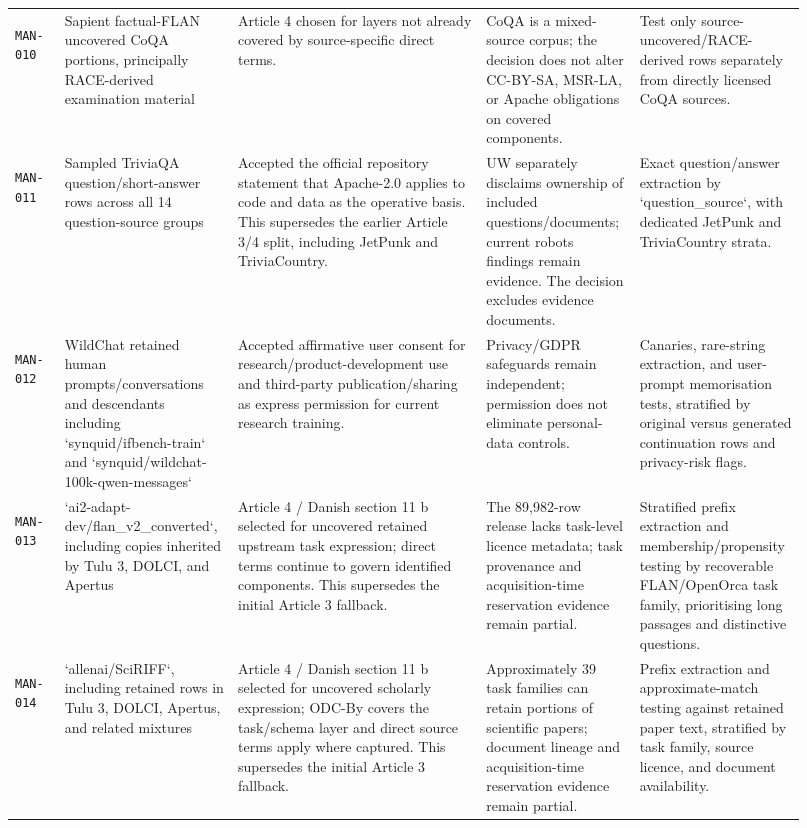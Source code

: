 \documentclass[9pt,a4paper]{article}
\newcommand{\manid}[1]{\hypertarget{manual:#1}{\texttt{#1}}}
\begin{document}
\begin{landscape}
\begin{longtable}{@{}L{0.06\linewidth}L{0.18\linewidth}L{0.30\linewidth}L{0.18\linewidth}L{0.20\linewidth}@{}}
\manid{MAN-010} & Sapient factual-FLAN uncovered CoQA portions, principally RACE-derived examination material & Article 4 chosen for layers not already covered by source-specific direct terms. & CoQA is a mixed-source corpus; the decision does not alter CC-BY-SA, MSR-LA, or Apache obligations on covered components. & Test only source-uncovered/RACE-derived rows separately from directly licensed CoQA sources. \\
\manid{MAN-011} & Sampled TriviaQA question/short-answer rows across all 14 question-source groups & Accepted the official repository statement that Apache-2.0 applies to code and data as the operative basis. This supersedes the earlier Article 3/4 split, including JetPunk and TriviaCountry. & UW separately disclaims ownership of included questions/documents; current robots findings remain evidence. The decision excludes evidence documents. & Exact question/answer extraction by `question\_source`, with dedicated JetPunk and TriviaCountry strata. \\
\manid{MAN-012} & WildChat retained human prompts/conversations and descendants including `synquid/ifbench-train` and `synquid/wildchat-100k-qwen-messages` & Accepted affirmative user consent for research/product-development use and third-party publication/sharing as express permission for current research training. & Privacy/GDPR safeguards remain independent; permission does not eliminate personal-data controls. & Canaries, rare-string extraction, and user-prompt memorisation tests, stratified by original versus generated continuation rows and privacy-risk flags. \\
\manid{MAN-013} & `ai2-adapt-dev/flan\_v2\_converted`, including copies inherited by Tulu 3, DOLCI, and Apertus & Article 4 / Danish section 11 b selected for uncovered retained upstream task expression; direct terms continue to govern identified components. This supersedes the initial Article 3 fallback. & The 89,982-row release lacks task-level licence metadata; task provenance and acquisition-time reservation evidence remain partial. & Stratified prefix extraction and membership/propensity testing by recoverable FLAN/OpenOrca task family, prioritising long passages and distinctive questions. \\
\manid{MAN-014} & `allenai/SciRIFF`, including retained rows in Tulu 3, DOLCI, Apertus, and related mixtures & Article 4 / Danish section 11 b selected for uncovered scholarly expression; ODC-By covers the task/schema layer and direct source terms apply where captured. This supersedes the initial Article 3 fallback. & Approximately 39 task families can retain portions of scientific papers; document lineage and acquisition-time reservation evidence remain partial. & Prefix extraction and approximate-match testing against retained paper text, stratified by task family, source licence, and document availability. \\

\end{longtable}
\end{landscape}
\end{document}
